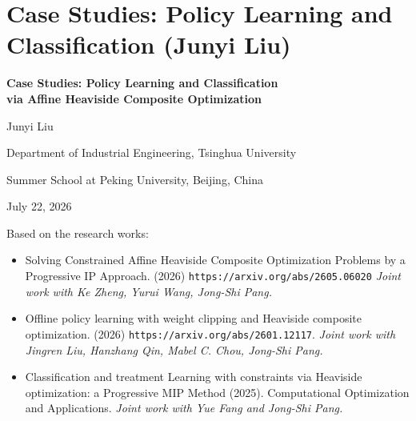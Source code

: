 \documentclass[aspectratio=169,xcolor=dvipsnames]{beamer}
\begin{document}
\section{Case Studies: Policy Learning and Classification (Junyi Liu)}

\begin{frame}[plain]
  \hypertarget{chapter-case-studies}{}
  \centering
  \vfill
  {\large\bfseries
    Case Studies: Policy Learning and Classification\\[2pt]
    via Affine Heaviside Composite Optimization\par}
  \vspace{0.55cm}
  {\large Junyi Liu\par}
  \vspace{0.22cm}
  Department of Industrial Engineering, Tsinghua University\par
  \vspace{0.40cm}
  Summer School at Peking University, Beijing, China\par
  \vspace{0.08cm}
  July 22, 2026\par
  \vfill
\end{frame}

\begin{frame}{Based on the research works:}
  \small
  \begin{itemize}
    \setlength{\itemsep}{0.24cm}
    \item[--] Solving Constrained Affine Heaviside Composite Optimization
      Problems by a Progressive IP Approach. (2026)
      {\footnotesize\texttt{https://arxiv.org/abs/2605.06020}}
      \textit{Joint work with Ke Zheng, Yurui Wang, Jong-Shi Pang.}
    \item[--] Offline policy learning with weight clipping and Heaviside
      composite optimization. (2026)
      {\footnotesize\texttt{https://arxiv.org/abs/2601.12117}}.
      \textit{Joint work with Jingren Liu, Hanzhang Qin, Mabel C. Chou,
      Jong-Shi Pang.}
    \item[--] Classification and treatment Learning with constraints via
      Heaviside optimization: a Progressive MIP Method (2025). Computational
      Optimization and Applications.
      \textit{Joint work with Yue Fang and Jong-Shi Pang.}
  \end{itemize}
\end{frame}
\end{document}
